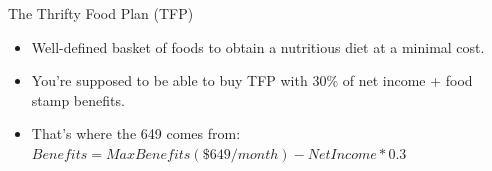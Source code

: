 \documentclass{beamer}
\begin{document}
{
    \begin{frame}[plain]
     \end{frame}
}

\begin{frame}{The Thrifty Food Plan (TFP)}
  \setlength{\leftmargini}{1em}
\begin{itemize}
\item
Well-defined basket of foods to obtain a nutritious diet at a minimal cost.

\item
You're supposed to be able to buy TFP with 30\% of net income + food stamp benefits.

\item That's where the 649 comes from: $ Benefits=MaxBenefits(\$649/month)-NetIncome*0.3 $
\end{itemize}
\end{frame}



\end{document}
